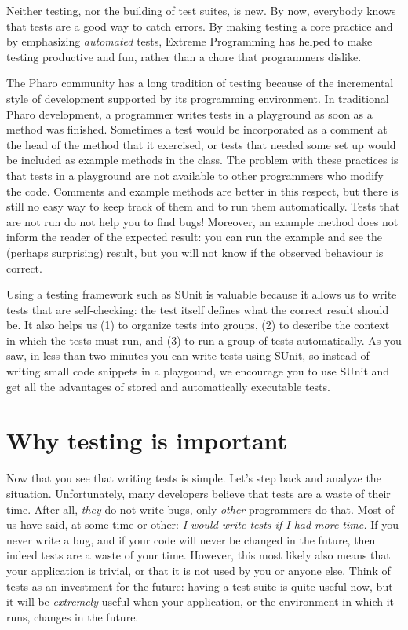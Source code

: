 \documentclass[10pt,twoside,english]{_support/latex/sbabook/sbabook}
\begin{document}
Neither testing, nor the building of test suites, is new. By now, everybody knows that
tests are a good way to catch errors. By making testing a core practice and by emphasizing \textit{automated} tests, Extreme Programming has helped to make testing
productive and fun, rather than a chore that programmers dislike.

 The Pharo community has a long tradition of testing because of the incremental style of
development supported by its programming environment. In traditional Pharo
development, a programmer writes tests in a playground as soon as a method
was finished. Sometimes a test would be incorporated as a comment at the head of
the method that it exercised, or tests that needed some set up would be included
as example methods in the class. The problem with these practices is that tests
in a playground are not available to other programmers who modify the code.
Comments and example methods are better in this respect, but there is still no
easy way to keep track of them and to run them automatically. Tests that are not
run do not help you to find bugs! Moreover, an example method does not inform
the reader of the expected result: you can run the example and see the (perhaps
surprising) result, but you will not know if the observed behaviour is correct.

Using a testing framework such as SUnit  is valuable because it allows us to write tests that are self-checking:
the test itself defines what the correct result should be. It also helps us (1) to
organize tests into groups, (2) to describe the context in which the tests must run,
and (3) to run a group of tests automatically. As you saw, in less than two minutes you can
write tests using SUnit, so instead of writing small code snippets in a
playgound, we encourage you to use SUnit and get all the advantages of stored
and automatically executable tests.
\section{Why testing is important}\label{sec:whytest}
Now that you see that writing tests is simple. Let's step back and analyze the situation.
Unfortunately, many developers believe that tests are a waste of their time.
After all, \textit{they} do not write bugs, only \textit{other} programmers do that. Most
of us have said, at some time or other: \textit{I would write tests if I had more
time.} If you never write a bug, and if your code will never be changed in the
future, then indeed tests are a waste of your time. However, this most likely
also means that your application is trivial, or that it is not used by you or
anyone else. Think of tests as an investment for the future: having a test suite 
is quite useful now, but it will be \textit{extremely} useful when your
application, or the environment in which it runs, changes in the future.
\end{document}
